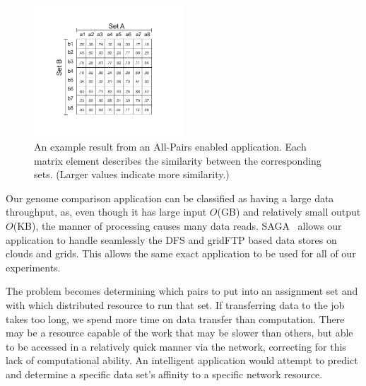 \documentclass{rspublic}
\begin{document}
\begin{figure}[!ht]
 \begin{center}
     \includegraphics[width=0.50\textwidth]{data/allpairs-exp.pdf}
\end{center}
\caption{\small An example result from an All-Pairs enabled
application.  Each matrix element describes the similarity between
 the corresponding sets. (Larger values indicate more similarity.)}
 \label{Fig:AllPairsExplanation}
\end{figure}

Our genome comparison application can be classified as having a large
data throughput, as, even though it has large input $O$(GB) and
relatively small output $O$(KB), the manner of processing causes many
data reads. SAGA~\citep{saga_url} allows our application to handle
seamlessly the DFS and gridFTP based data stores on clouds and grids.
This allows the same exact application to be used for all of our
experiments. 

The problem becomes determining which pairs to put into an assignment
set and with which distributed resource to run that set. If transferring
data to the job takes too long, we spend more time on data transfer than
computation.  There may be a resource capable of the work that may be
slower than others, but able to be accessed in a relatively quick manner
via the network, correcting for this lack of computational ability. An
intelligent application would attempt to predict and determine a
specific data set's affinity to a specific network resource.

\end{document}

